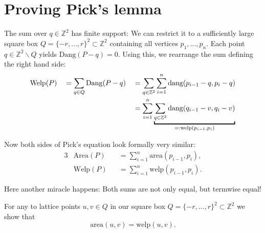 \documentclass[a4paper]{amsart}
\numberwithin{equation}{section}
\theoremstyle{plain}
\theoremstyle{definition}
\newcommand{\Z}{\mathbb{Z}}
\newcommand{\minus}{\smallsetminus}
\newcommand{\area}{\mathrm{area}}
\newcommand{\Area}{\mathrm{Area}}
\newcommand{\dang}{\mathrm{dang}}
\newcommand{\Dang}{\mathrm{Dang}}
\newcommand{\welp}{\mathrm{welp}}
\newcommand{\Welp}{\mathrm{Welp}}
\begin{document}
\section{Proving Pick's lemma}

The sum over $q \in \Z^2$ has finite support:
We can restrict it to a sufficiently large
square box $Q = \{-r,\ldots,r\}^2 \subset \Z^2$
containing all vertices $p_1,\ldots,p_n$.
Each point $q \in \Z^2 \minus Q$ yields $\Dang(P-q) = 0$.
Using this, we rearrange the sum defining the right hand side:
\begin{alignat*}{3}
  & \Welp(P)
  && = \sum_{q \in Q} \Dang(P-q)
  && = \sum_{q \in \Z^2} \sum_{i=1}^n \dang(p_{i-1}-q, p_i-q) 
  \\ & && && = \sum_{i=1}^n
  \underbracket{ \sum_{q \in \Z^2} \dang(q_{i-1}-v, q_i-v) }_{\normalsize =: \welp(p_{i-1},p_i)}
\end{alignat*}

Now both sides of Pick's equation look formally very similar:
\begin{alignat*}{3}
  & \Area(P) && = \sum_{i=1}^{n} \area(p_{i-1},p_i) ,
  \\
  & \Welp(P) && = \sum_{i=1}^n \welp(p_{i-1},p_i) .
\end{alignat*}

Here another miracle happens:
Both sums are not only equal, but termwise equal!

For any to lattice points $u,v \in Q$
in our square box $Q = \{-r,\ldots,r\}^2 \subset \Z^2$
we show that
\[
\area(u,v) = \welp(u,v) .
\]
\end{document}
